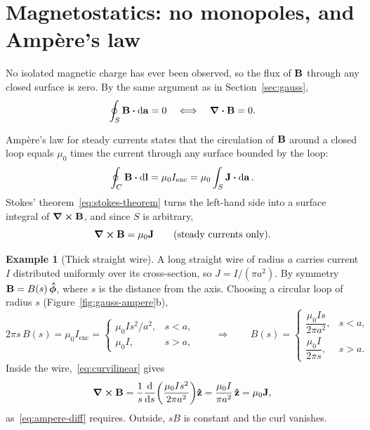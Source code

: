 \documentclass[11pt,a4paper]{article}
\theoremstyle{definition}
\newtheorem{example}{Example}[section]
\theoremstyle{remark}
\newcommand{\B}{\vb{B}}
\newcommand{\J}{\vb{J}}
\begin{document}
\section{Magnetostatics: no monopoles, and Ampère's law}
\label{sec:ampere}

No isolated magnetic charge has ever been observed, so the flux of $\B$ through any closed surface is zero. By the same argument as in Section~\ref{sec:gauss},
\begin{equation}\label{eq:no-monopole}
  \oint_S \B\vdot\dd{\vb{a}} = 0 \quad\Longleftrightarrow\quad \div{\B} = 0.
\end{equation}

Ampère's law for steady currents states that the circulation of $\B$ around a closed loop equals $\mu_0$ times the current through any surface bounded by the loop:
\begin{equation}\label{eq:ampere-integral}
  \oint_C \B\vdot\dd{\vb{l}} = \mu_0 I_\text{enc} = \mu_0 \int_S \J\vdot\dd{\vb{a}}.
\end{equation}
Stokes' theorem~\eqref{eq:stokes-theorem} turns the left-hand side into a surface integral of $\curl{\B}$, and since $S$ is arbitrary,
\begin{equation}\label{eq:ampere-diff}
  \curl{\B} = \mu_0 \J \qquad \text{(steady currents only).}
\end{equation}

\begin{example}[Thick straight wire]\label{ex:wire}
A long straight wire of radius $a$ carries current $I$ distributed uniformly over its cross-section, so $J = I/(\pi a^2)$. By symmetry $\B = B(s)\,\vu*{\phi}$, where $s$ is the distance from the axis. Choosing a circular loop of radius $s$ (Figure~\ref{fig:gauss-ampere}b),
\[
  2\pi s\,B(s) = \mu_0 I_\text{enc} =
  \begin{cases}
    \mu_0 I s^2/a^2, & s < a,\\
    \mu_0 I, & s > a,
  \end{cases}
  \qquad\Longrightarrow\qquad
  B(s) =
  \begin{cases}
    \dfrac{\mu_0 I s}{2\pi a^2}, & s < a,\\[10pt]
    \dfrac{\mu_0 I}{2\pi s}, & s > a.
  \end{cases}
\]
Inside the wire,~\eqref{eq:curvilinear} gives
\[
  \curl{\B} = \frac{1}{s}\dv{s}\qty(\frac{\mu_0 I s^2}{2\pi a^2})\vu{z} = \frac{\mu_0 I}{\pi a^2}\,\vu{z} = \mu_0 \J,
\]
as~\eqref{eq:ampere-diff} requires. Outside, $sB$ is constant and the curl vanishes.
\end{example}
\end{document}
